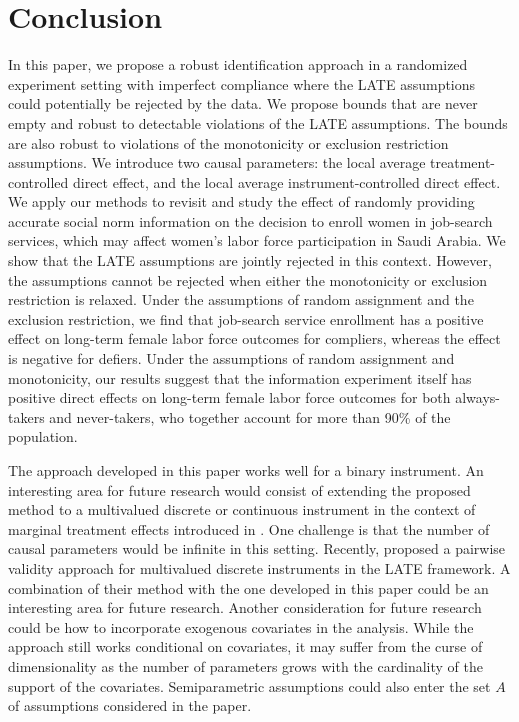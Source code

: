 \documentclass[12pt]{article}
\theoremstyle{plain}
\theoremstyle{definition}
\theoremstyle{remark}
\begin{document}
\section{Conclusion}
\label{sec:summary}
  In this paper, we propose a robust identification approach in a randomized experiment setting with imperfect compliance where the LATE assumptions could potentially be rejected by the data. We propose bounds that are never empty and robust to detectable violations of the LATE assumptions. The bounds are also robust to violations of the monotonicity or exclusion restriction assumptions. 
  We introduce two causal parameters: the local average treatment-controlled direct effect, and the local average instrument-controlled direct effect. We apply our methods to revisit \cite{bursztyn2020misperceived} and study the effect of randomly providing accurate social norm information on the decision to enroll women in job-search services, which may affect women's labor force participation in Saudi Arabia. We show that the LATE assumptions are jointly rejected in this context. However, the assumptions cannot be rejected when either the monotonicity or exclusion restriction is relaxed. Under the assumptions of random assignment and the exclusion restriction, we find that job-search service enrollment has a positive effect on long-term female labor force outcomes for compliers, whereas the effect is negative for defiers. Under the assumptions of random assignment and monotonicity, our results suggest that the information experiment itself has positive direct effects on long-term female labor force outcomes for both always-takers and never-takers, who together account for more than 90\% of the population.
  

  The approach developed in this paper works well for a binary instrument. An interesting area for future research would consist of extending the proposed method to a multivalued discrete or continuous instrument in the context of marginal treatment effects introduced in \cite{Heckman2001Policy-RelevantEffects, Heckman2005StructuralEvaluation}. One challenge is that the number of causal parameters would be infinite in this setting. Recently, \cite{sun2022pairwise} proposed a pairwise validity approach for multivalued discrete instruments in the LATE framework. A combination of their method with the one developed in this paper could be an interesting area for future research. 
  Another consideration for future research could be how to incorporate exogenous covariates in the analysis. While the approach still works conditional on covariates, it may suffer from the curse of dimensionality as the number of parameters grows with the cardinality of the support of the covariates. Semiparametric assumptions could also enter the set $A$ of assumptions considered in the paper. 
\end{document}
